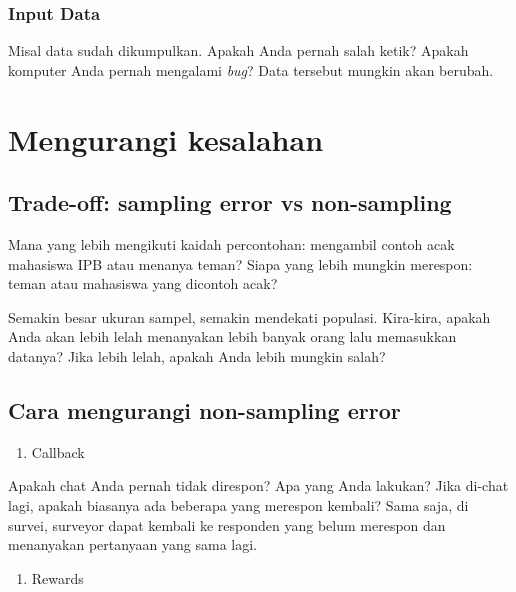 \documentclass[
  letterpaper,
  DIV=11,
  numbers=noendperiod]{scrreprt}
\providecommand{\tightlist}{%
  \setlength{\itemsep}{0pt}\setlength{\parskip}{0pt}}\usepackage{longtable,booktabs,array}
\begin{document}
\hypertarget{input-data}{%
\subsubsection{Input Data}\label{input-data}}

Misal data sudah dikumpulkan. Apakah Anda pernah salah ketik? Apakah
komputer Anda pernah mengalami \emph{bug}? Data tersebut mungkin akan
berubah.

\hypertarget{mengurangi-kesalahan}{%
\section{Mengurangi kesalahan}\label{mengurangi-kesalahan}}

\hypertarget{trade-off-sampling-error-vs-non-sampling}{%
\subsection{Trade-off: sampling error vs
non-sampling}\label{trade-off-sampling-error-vs-non-sampling}}

Mana yang lebih mengikuti kaidah percontohan: mengambil contoh acak
mahasiswa IPB atau menanya teman? Siapa yang lebih mungkin merespon:
teman atau mahasiswa yang dicontoh acak?

Semakin besar ukuran sampel, semakin mendekati populasi. Kira-kira,
apakah Anda akan lebih lelah menanyakan lebih banyak orang lalu
memasukkan datanya? Jika lebih lelah, apakah Anda lebih mungkin salah?

\hypertarget{cara-mengurangi-non-sampling-error}{%
\subsection{Cara mengurangi non-sampling
error}\label{cara-mengurangi-non-sampling-error}}

\begin{enumerate}
\def\labelenumi{\arabic{enumi}.}
\tightlist
\item
  Callback
\end{enumerate}

Apakah chat Anda pernah tidak direspon? Apa yang Anda lakukan? Jika
di-chat lagi, apakah biasanya ada beberapa yang merespon kembali? Sama
saja, di survei, surveyor dapat kembali ke responden yang belum merespon
dan menanyakan pertanyaan yang sama lagi.

\begin{enumerate}
\def\labelenumi{\arabic{enumi}.}
\setcounter{enumi}{1}
\tightlist
\item
  Rewards
\end{enumerate}
\end{document}
